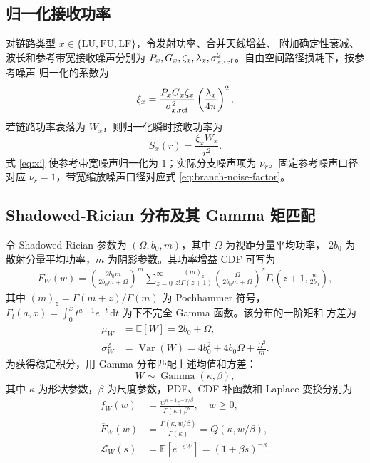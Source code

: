 \documentclass[UTF8,a4paper,11pt]{ctexart}
\newcommand{\E}{\mathbb E}
\newcommand{\Var}{\operatorname{Var}}
\newcommand{\dd}{\,\mathrm d}
\newcommand{\Lcal}{\mathcal L}
\begin{document}
\subsection{归一化接收功率}

对链路类型 $x\in\{\mathrm{LU},\mathrm{FU},\mathrm{LF}\}$，令发射功率、合并天线增益、
附加确定性衰减、波长和参考带宽接收噪声分别为
$P_x,G_x,\zeta_x,\lambda_x,\sigma_{x,\rm ref}^2$。自由空间路径损耗下，按参考噪声
归一化的系数为
\begin{equation}
 \xi_x
 =
 \frac{P_xG_x\zeta_x}{\sigma_{x,\rm ref}^2}
 \left(\frac{\lambda_x}{4\pi}\right)^2.
 \label{eq:xi}
\end{equation}
若链路功率衰落为 $W_x$，则归一化瞬时接收功率为
\begin{equation}
 S_x(r)=\frac{\xi_xW_x}{r^2}.
 \label{eq:normalized-power}
\end{equation}
式 \eqref{eq:xi} 使参考带宽噪声归一化为 $1$；实际分支噪声项为
$\nu_r$。固定参考噪声口径对应 $\nu_r=1$，带宽缩放噪声口径对应式
\eqref{eq:branch-noise-factor}。

\subsection{Shadowed-Rician 分布及其 Gamma 矩匹配}

令 Shadowed-Rician 参数为 $(\Omega,b_0,m)$，其中 $\Omega$ 为视距分量平均功率，
$2b_0$ 为散射分量平均功率，$m$ 为阴影参数。其功率增益 CDF 可写为
\begin{equation}
\begin{split}
 F_W(w)
 =
 \left(\frac{2b_0m}{2b_0m+\Omega}\right)^m
 \sum_{z=0}^{\infty}
 \frac{(m)_z}{z!\Gamma(z+1)}
 \left(\frac{\Omega}{2b_0m+\Omega}\right)^z
 \Gamma_l\left(z+1,\frac{w}{2b_0}\right),
\end{split}
\label{eq:sr-cdf}
\end{equation}
其中 $(m)_z=\Gamma(m+z)/\Gamma(m)$ 为 Pochhammer 符号，
$\Gamma_l(a,x)=\int_0^x t^{a-1}e^{-t}\dd t$ 为下不完全 Gamma 函数。该分布的一阶矩和
方差为
\begin{align}
 \mu_W
 &=\E[W]=2b_0+\Omega,\label{eq:sr-mean}\\
 \sigma_W^2
 &=\Var(W)
 =4b_0^2+4b_0\Omega+\frac{\Omega^2}{m}.
 \label{eq:sr-var}
\end{align}
为获得稳定积分，用 Gamma 分布匹配上述均值和方差：
\begin{equation}
 W\sim\operatorname{Gamma}(\kappa,\beta),
 \label{eq:gamma-fading}
\end{equation}
其中 $\kappa$ 为形状参数，$\beta$ 为尺度参数，PDF、CDF 补函数和 Laplace 变换分别为
\begin{align}
 f_W(w)
 &=\frac{w^{\kappa-1}e^{-w/\beta}}
 {\Gamma(\kappa)\beta^\kappa},\quad w\geq0,\label{eq:gamma-pdf}\\
 \overline F_W(w)
 &=\frac{\Gamma(\kappa,w/\beta)}{\Gamma(\kappa)}
 =Q(\kappa,w/\beta),\label{eq:gamma-ccdf}\\
 \Lcal_W(s)
 &=\E[e^{-sW}]=(1+\beta s)^{-\kappa}.
 \label{eq:gamma-lt}
\end{align}
\end{document}
